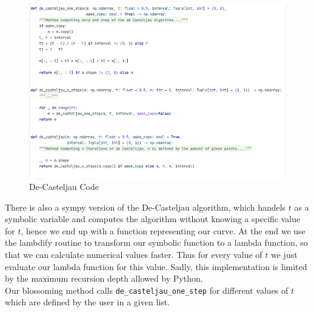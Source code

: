 \begin{figure}[H]
    \centering
    \includegraphics[width=\textwidth]{de_cas.png}
    \caption{De-Casteljau Code}
    \label{fig:my_label}
\end{figure}

There is also a sympy version of the De-Casteljau algorithm, which handels $t$ as a symbolic variable and computes the algorithm without knowing a specific value for $t$, hence we end up with a function representing our curve. At the end we use the lambdify routine to transform our symbolic function to a lambda function, so that we can calculate numerical values faster. Thus for every value of $t$ we just evaluate our lambda function for this value. Sadly, this implementation is limited by the maximum recursion depth allowed by Python.\\

Our blossoming method calls \texttt{de\_casteljau\_one\_step} for different values of $t$ which are defined by the user in a given list.
\newpage
